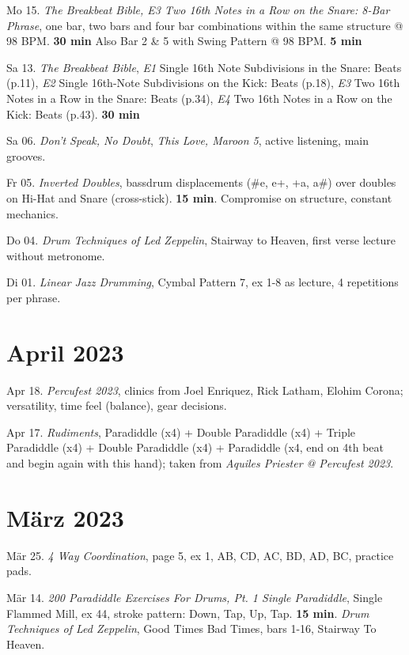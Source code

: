 \documentclass[
]{book}
\begin{document}
Mo 15. \emph{The Breakbeat Bible, E3 Two 16th Notes in a Row on the Snare: 8-Bar Phrase}, one bar, two bars and four bar combinations within the same structure @ 98 BPM. \textbf{30 min} Also Bar 2 \& 5 with Swing Pattern @ 98 BPM. \textbf{5 min}

Sa 13. \emph{The Breakbeat Bible}, \emph{E1} Single 16th Note Subdivisions in the Snare: Beats (p.11), \emph{E2} Single 16th-Note Subdivisions on the Kick: Beats (p.18), \emph{E3} Two 16th Notes in a Row in the Snare: Beats (p.34), \emph{E4} Two 16th Notes in a Row on the Kick: Beats (p.43). \textbf{30 min}

Sa 06. \emph{Don't Speak, No Doubt}, \emph{This Love, Maroon 5}, active listening, main grooves.

Fr 05. \emph{Inverted Doubles}, bassdrum displacements (\#e, e+, +a, a\#) over doubles on Hi-Hat and Snare (cross-stick). \textbf{15 min}. Compromise on structure, constant mechanics.

Do 04. \emph{Drum Techniques of Led Zeppelin}, Stairway to Heaven, first verse lecture without metronome.

Di 01. \emph{Linear Jazz Drumming}, Cymbal Pattern 7, ex 1-8 as lecture, 4 repetitions per phrase.

\hypertarget{april-2023}{%
\section*{April 2023}\label{april-2023}}

Apr 18. \emph{Percufest 2023}, clinics from Joel Enriquez, Rick Latham, Elohim Corona; versatility, time feel (balance), gear decisions.

Apr 17. \emph{Rudiments}, Paradiddle (x4) + Double Paradiddle (x4) + Triple Paradiddle (x4) + Double Paradiddle (x4) + Paradiddle (x4, end on 4th beat and begin again with this hand); taken from \emph{Aquiles Priester @ Percufest 2023}.

\hypertarget{muxe4rz-2023}{%
\section*{März 2023}\label{muxe4rz-2023}}

Mär 25. \emph{4 Way Coordination}, page 5, ex 1, AB, CD, AC, BD, AD, BC, practice pads.

Mär 14. \emph{200 Paradiddle Exercises For Drums, Pt. 1 Single Paradiddle}, Single Flammed Mill, ex 44, stroke pattern: Down, Tap, Up, Tap. \textbf{15 min}. \emph{Drum Techniques of Led Zeppelin}, Good Times Bad Times, bars 1-16, Stairway To Heaven.
\end{document}
